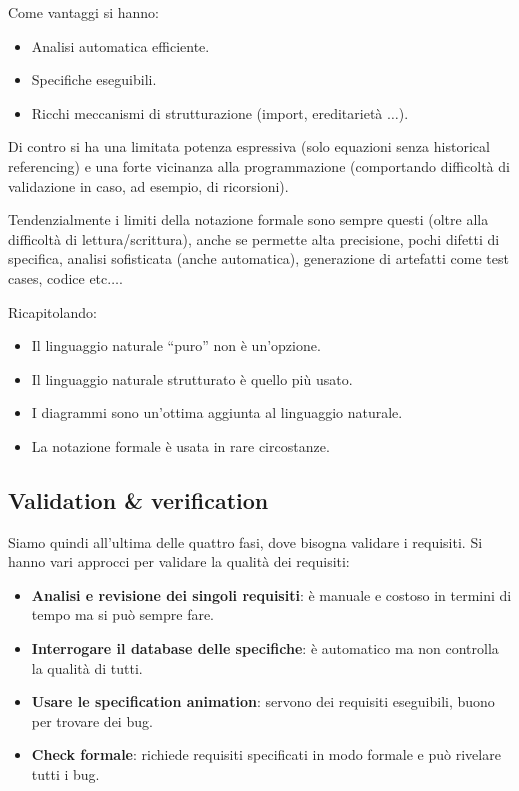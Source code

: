 Come vantaggi si hanno:
\begin{itemize}
      \item Analisi automatica efficiente.
      \item Specifiche eseguibili.
      \item Ricchi meccanismi di strutturazione (import, ereditarietà $\dots$).
\end{itemize}
Di contro si ha una limitata potenza espressiva (solo equazioni senza historical
referencing) e una forte vicinanza alla programmazione (comportando difficoltà
di validazione in caso, ad esempio, di ricorsioni).

Tendenzialmente i limiti della notazione formale sono sempre questi (oltre alla
difficoltà di lettura/scrittura), anche se permette alta precisione, pochi difetti
di specifica, analisi sofisticata (anche automatica), generazione di artefatti
come test cases, codice etc$\dots$.

Ricapitolando:
\begin{itemize}
      \item Il linguaggio naturale “puro” non è un'opzione.
      \item Il linguaggio naturale strutturato è quello più usato.
      \item I diagrammi sono un'ottima aggiunta al linguaggio naturale.
      \item La notazione formale è usata in rare circostanze.
\end{itemize}
\subsection{Validation \& verification}
Siamo quindi all'ultima delle quattro fasi, dove bisogna validare i requisiti.
Si hanno vari approcci per validare la qualità dei requisiti:
\begin{itemize}
      \item \textbf{Analisi e revisione dei singoli requisiti}: è manuale e
            costoso in termini di tempo ma si può sempre fare.
      \item \textbf{Interrogare il database delle specifiche}: è automatico ma
            non controlla la qualità di tutti.
      \item \textbf{Usare le specification animation}: servono dei requisiti
            eseguibili, buono per trovare dei bug.
      \item \textbf{Check formale}: richiede requisiti specificati in modo
            formale e può rivelare tutti i bug.
\end{itemize}

